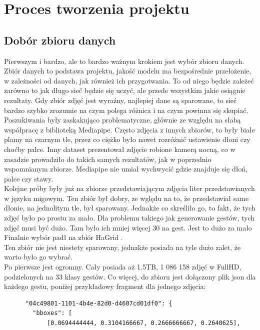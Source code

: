 \documentclass[12pt]{article}
\begin{document}
\begin{sloppypar}
\section{Proces tworzenia projektu} \label{proces}
{
  \subsection{Dobór zbioru danych} \label{dataset}
  {
    Pierwszym i bardzo, ale to bardzo ważnym krokiem jest wybór zbioru danych. 
    Zbiór danych to podstawa projektu, jakość modelu ma bezpośrednie przełożenie, w zależności od danych, jak również ich przygotwania. 
    To od niego będzie zależeć zarówno to jak długo sieć będzie się uczyć, ale przede wszystkim jakie osiągnie rezultaty. 
    Gdy zbiór zdjęć jest wyraźny, najlepiej dane są sparowane, to sieć bardzo szybko zrozumie na czym polega różnica i na czym powinna się skupiać. \\
    Poszukiwania były zaskakująco problematyczne, głównie ze względu na słabą współpracę z biblioteką Mediapipe. 
    Często zdjęcia z innych zbiorów, to były białe plamy na czarnym tle, przez co ciężko było nawet rozróżnić ustawienie dłoni czy choćby palce.
    Inny dataset prezentował zdjęcie robione kamerą nocną, co w zasadzie prowadziło do takich samych rezultatów, jak w poprzednio wspomnianym zbiorze.
    Mediapipe nie umiał wychwycić gdzie znajduje się dłoń, palce czy stawy. \\
    Kolejne próby były już na zbiorze przedstawiającym zdjęcia liter przedstawianych w języku migowym. 
    Ten zbiór był dobry, ze wględu na to, że przedstawiał same dłonie, na jednolitym tle, był sparowany. 
    Jednakże co skreśliło go, to fakt, że tych zdjęć było po prostu za mało. 
    Dla problemu takiego jak generowanie gestów, tych zdjęć musi być dużo. Tam było ich mniej więcej 30 na gest. Jest to dużo za mało \\
    Finalnie wybór padł na zbiór HaGrid \cite{nuzhdin2024hagridv21mimagesstatic}. \\
    Ten zbiór nie jest niestety sparowany, jednakże posiada na tyle dużo zalet, że warto było go wybrać. \\
    Po pierwsze jest ogromny. Cały posiada aż 1.5TB, 1 086 158 zdjęć w FullHD, podzielonych na 33 klasy gestów. 
    Co więcej, do zbioru jest dołączony plik json dla każdego gestu, poniżej przykładowy fragment dla jednego zdjęcia:
    \begin{lstlisting}
      "04c49801-1101-4b4e-82d0-d4607cd01df0": {
        "bboxes": [
            [0.0694444444, 0.3104166667, 0.2666666667, 0.2640625],

\end{lstlisting}}}
\end{sloppypar}
\end{document}
